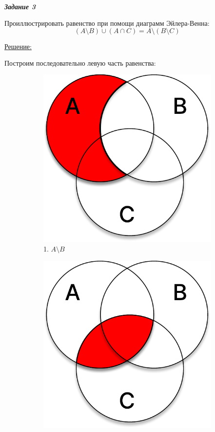 \documentclass[11pt]{article}
\begin{document}
\pagebreak

\textit{\textbf{Задание 3}}

Проиллюстрировать равенство при помощи диаграмм Эйлера-Венна:
$$(A \setminus B) \cup (A \cap C) = A \setminus (B \setminus C)$$

\underline{Решение:}

Построим последовательно левую часть равенства:

\begin{figure}[h]
	\captionsetup[subfigure]{labelformat=empty}
	\centering
	\begin{subfigure}{.32\textwidth}
		\centering
		\includegraphics[width=1\linewidth]{t3_1_1.pdf}
		\caption{1. $A \setminus B$}
	\end{subfigure}
	\begin{subfigure}{.32\textwidth}
		\centering
		\includegraphics[width=1\linewidth]{t3_1_2.pdf}

\end{subfigure}
\end{figure}
\end{document}

